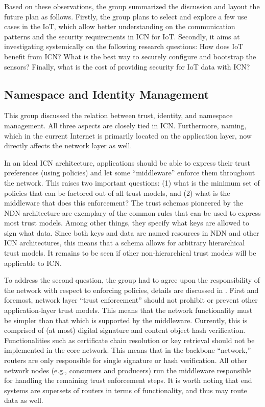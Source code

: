 Based on these observations, the group summarized the discussion and layout the future plan as follows. Firstly, the group plans to  select and explore a few use cases in the IoT, which allow better understanding on the communication patterns and the security requirements in ICN for IoT. Secondly, it aims at investigating systemically on the following research questions: How does IoT benefit from ICN? What is the best way to securely configure and bootstrap the sensors? Finally, what is the cost of providing security for IoT data with ICN?

\subsection{Namespace and Identity Management}
This group discussed the relation between trust, identity, and namespace management.
All three aspects are closely tied in ICN.
Furthermore, naming, which in the current Internet is primarily located on the application layer, now directly affects the network layer as well.

In an ideal ICN architecture, applications should be able to express their trust preferences (using policies) and let some ``middleware'' enforce them throughout the network. This raises two important questions: (1) what is the minimum set of policies that can be factored out of all trust models, and (2) what is the middleware that does this enforcement? The trust schemas pioneered by the NDN architecture \cite{schemas} are exemplary of the common rules that can be used to express most trust models. Among other things, they specify what keys are allowed to sign what data. Since both keys and data are named resources in NDN and other ICN architectures, this means that a schema allows for arbitrary hierarchical trust models. It remains to be seen if other non-hierarchical trust models will be applicable to ICN.

To address the second question, the group had to agree upon the responsibility of the network with respect to enforcing policies, details are discussed in \cite{trust}.
First and foremost, network layer ``trust enforcement'' should not prohibit or prevent other app\-lication-layer trust models. This means that the network functionality must be simpler than that which is supported by the middleware. Currently, this is comprised of (at most) digital signature and content object hash verification. Functionalities such as certificate chain resolution or key retrieval should not be implemented in the core network. This means that in the backbone ``network,'' routers are only responsible for single signature or hash verification. All other network nodes (e.g., consumers and producers) run the middleware responsible for handling the remaining trust enforcement steps. It is worth noting that end systems are supersets of routers in terms of functionality, and thus may route data as well.

